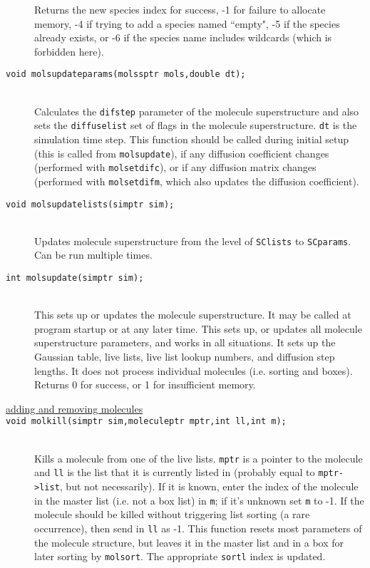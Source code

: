 \documentclass {book}
\newcommand {\ttt} {\texttt}
\begin{document}
\begin{description}
Returns the new species index for success, -1 for failure to allocate memory, -4 if trying to add a species named ``empty", -5 if the species already exists, or -6 if the species name includes wildcards (which is forbidden here).

\item[\ttt{void molsupdateparams(molssptr mols,double dt);}]
\hfill \\
Calculates the \ttt{difstep} parameter of the molecule superstructure and also sets the \ttt{diffuselist} set of flags in the molecule superstructure. \ttt{dt} is the simulation time step. This function should be called during initial setup (this is called from \ttt{molsupdate}), if any diffusion coefficient changes (performed with \ttt{molsetdifc}), or if any diffusion matrix changes (performed with \ttt{molsetdifm}, which also updates the diffusion coefficient).

\item[\ttt{void molsupdatelists(simptr sim);}]
\hfill \\
Updates molecule superstructure from the level of \ttt{SClists} to \ttt{SCparams}. Can be run multiple times.

\item[\ttt{int molsupdate(simptr sim);}]
\hfill \\
This sets up or updates the molecule superstructure. It may be called at program startup or at any later time. This sets up, or updates all molecule superstructure parameters, and works in all situations. It sets up the Gaussian table, live lists, live list lookup numbers, and diffusion step lengths. It does not process individual molecules (i.e. sorting and boxes). Returns 0 for success, or 1 for insufficient memory.

\item[\underline{adding and removing molecules}]

\item[\ttt{void molkill(simptr sim,moleculeptr mptr,int ll,int m);}]
\hfill \\
Kills a molecule from one of the live lists. \ttt{mptr} is a pointer to the molecule and \ttt{ll} is the list that it is currently listed in (probably equal to \ttt{mptr->list}, but not necessarily). If it is known, enter the index of the molecule in the master list (i.e. not a box list) in \ttt{m}; if it's unknown set \ttt{m} to -1. If the molecule should be killed without triggering list sorting (a rare occurrence), then send in \ttt{ll} as -1. This function resets most parameters of the molecule structure, but leaves it in the master list and in a box for later sorting by \ttt{molsort}. The appropriate \ttt{sortl} index is updated.


\end{description}
\end{document}
